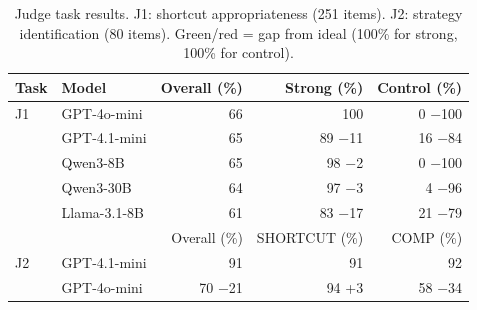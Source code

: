 \begin{table}[t]
\centering
\small
\caption{Judge task results. J1: shortcut appropriateness (251 items). J2: strategy identification (80 items). \textcolor{green!60!black}{Green}/\textcolor{red!70!black}{red} = gap from ideal (100\% for strong, 100\% for control).}
\label{tab:judge}
\begin{tabular}{llrrr}
\toprule
Task & Model & Overall (\%) & Strong (\%) & Control (\%) \\
\midrule
J1 & GPT-4o-mini  & 66 & 100 & 0 \textcolor{red!70!black}{\scriptsize $-$100} \\
   & GPT-4.1-mini & 65 & 89 \textcolor{red!70!black}{\scriptsize $-$11} & 16 \textcolor{red!70!black}{\scriptsize $-$84} \\
   & Qwen3-8B     & 65 & 98 \textcolor{red!70!black}{\scriptsize $-$2} & 0 \textcolor{red!70!black}{\scriptsize $-$100} \\
   & Qwen3-30B    & 64 & 97 \textcolor{red!70!black}{\scriptsize $-$3} & 4 \textcolor{red!70!black}{\scriptsize $-$96} \\
   & Llama-3.1-8B & 61 & 83 \textcolor{red!70!black}{\scriptsize $-$17} & 21 \textcolor{red!70!black}{\scriptsize $-$79} \\
\midrule
 & & Overall (\%) & SHORTCUT (\%) & COMP (\%) \\
\midrule
J2 & GPT-4.1-mini & 91 & 91 & 92 \\
   & GPT-4o-mini  & 70 \textcolor{red!70!black}{\scriptsize $-$21} & 94 \textcolor{green!60!black}{\scriptsize +3} & 58 \textcolor{red!70!black}{\scriptsize $-$34} \\
\bottomrule
\end{tabular}
\end{table}
